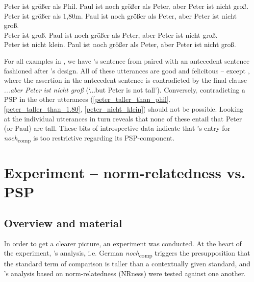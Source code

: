 \documentclass[output=paper,
modfonts
]{langscibook}
\begin{document}
\ea \label{ub_hs_all} \ea Peter ist größer als Phil. Paul ist noch größer als Peter, aber Peter ist nicht groß.\label{peter_taller_than_phil} \\ 
\ex Peter ist größer als 1,80m.  Paul ist noch größer als Peter, aber Peter ist nicht groß.\label{peter_taller_than_1.80}\\ 
\ex *Peter ist groß. Paul ist noch größer als Peter, aber Peter ist nicht groß.\label{peter_tall}\\ 
\ex Peter ist nicht klein. Paul ist noch größer als Peter, aber Peter ist nicht groß.\label{peter_nicht_klein}\\
\z\z

For all examples in , we have \citeauthor{Hofstetter2013}'s sentence from  paired with an antecedent sentence fashioned after \citeauthor{umbach2009a_comp}'s design. All of these utterances are good and felicitous -- except , where the assertion in the antecedent sentence is contradicted by the final clause \textit{...aber Peter ist nicht groß} (`...but Peter is not tall'). Conversely, contradicting a PSP in the other utterances (\ref{peter_taller_than_phil}, \ref{peter_taller_than_1.80}, \ref{peter_nicht_klein}) should not be possible. Looking at the individual utterances in turn reveals that none of these entail that Peter (or Paul) are tall. These bits of introspective data indicate that \citeauthor{Hofstetter2013}'s entry for \textit{noch}\textsubscript{comp} is too restrictive regarding its PSP-component. 


\section{Experiment -- norm-relatedness vs. PSP}\label{sec_experiment}
\subsection{Overview and material}

In order to get a clearer picture, an experiment was conducted. At the heart of the experiment, \citeauthor{Hofstetter2013}'s \citeyearpar{Hofstetter2013} analysis, i.e. German \textit{noch}\textsubscript{comp} triggers the presupposition that the standard term of comparison is taller than a contextually given standard, and \citeauthor{umbach2009a_comp}'s \citeyearpar{umbach2009a_comp} analysis based on norm-relatedness (NRness) were tested against one another.
\end{document}

